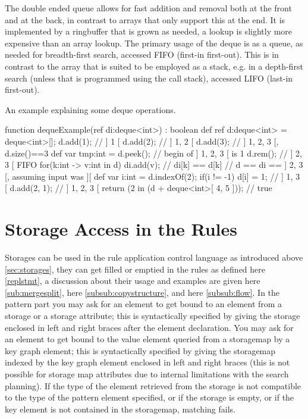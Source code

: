 \begin{note}
The double ended queue allows for fast addition and removal both at the front and at the back, in contrast to arrays that only support this at the end.
It is implemented by a ringbuffer that is grown as needed, a lookup is slightly more expensive than an array lookup.
The primary usage of the deque is as a queue, as needed for breadth-first search, accessed FIFO (first-in first-out).
This is in contrast to the array that is suited to be employed as a stack, e.g. in a depth-first search (unless that is programmed using the call stack), accessed LIFO (last-in first-out).
\end{note}

\begin{example}
An example explaining some deque operations.
\begin{grgen}
function dequeExample(ref di:deque<int>) : boolean
{
	def ref d:deque<int> = deque<int>[];
	d.add(1); // ] 1 [
	d.add(2); // ] 1, 2 [
	d.add(3); // ] 1, 2, 3 [, d.size()==3
	def var tmp:int = d.peek(); // begin of ] 1, 2, 3 [ is 1 
	d.rem(); // ] 2, 3 [ FIFO
	for(k:int -> v:int in d) {
		di.add(v); // di[k] == d[k]
	} // d == di == ] 2, 3 [, assuming input was ][
	def var i:int = d.indexOf(2);
	if(i != -1) {
		d[i] = 1;
	} // ] 1, 3 [
	d.add(2, 1); // ] 1, 2, 3 [
	return (2 in (d + deque<int>[ 4, 5 ])); // true
}
\end{grgen}
\end{example}


\section{Storage Access in the Rules} \label{sub:storageaccess}

Storages can be used in the rule application control language as introduced above \ref{sec:storages}, they can get filled or emptied in the rules as defined here \ref{replstmt}, a discussion about their usage and examples are given here \ref{sub:mergesplit}, here \ref{subsub:copystructure}, and here \ref{subsub:flow}.
In the pattern part you may ask for an element to get bound to an element from a storage or a storage attribute;
this is syntactically specified by giving the storage enclosed in left and right braces after the element declaration.
You may ask for an element to get bound to the value element queried from a storagemap by a key graph element;
this is syntactically specified by giving the storagemap indexed by the key graph element enclosed in left and right braces
(this is not possible for storage map attributes due to internal limitations with the search planning).
If the type of the element retrieved from the storage is not compatible to the type of the pattern element specified,
or if the storage is empty, or if the key element is not contained in the storagemap, matching fails.

